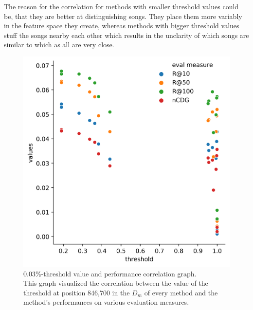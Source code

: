 The reason for the correlation for methods with smaller threshold values could be, that they are better at distinguishing songs. They place them more variably in the feature space they create, whereas methods with bigger threshold values stuff the songs nearby each other which results in the unclarity of which songs are similar to which as all are very close.

\begin{figure}[h]
    \centering
	\includegraphics[width=1\linewidth]{./img/nn_threshold_performance_correlation.png}
	\caption[0.03\%-threshold value and performance correlation graph]{0.03\%-threshold value and performance correlation graph. \\ This graph visualized the correlation between the value of the threshold at position 846,700 in the $D_m$ of every method and the method's performances on various evaluation measures.}
	\label{fig:threshold_correlation_graph}
\end{figure}




